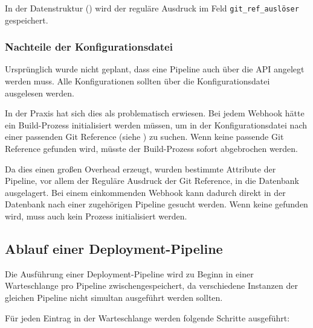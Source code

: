 In der Datenstruktur () wird der reguläre Ausdruck im Feld \texttt{git\_\allowbreak ref\_\allowbreak auslöser} gespeichert.

\subsubsection{Nachteile der Konfigurationsdatei}

Ursprünglich wurde nicht geplant, dass eine Pipeline auch über die API angelegt werden muss. Alle Konfigurationen sollten über die Konfigurationsdatei ausgelesen werden.

In der Praxis hat sich dies als problematisch erwiesen. Bei jedem Webhook hätte ein Build-Prozess initialisiert werden müssen, um in der Konfigurationsdatei nach einer passenden Git Reference (siehe ) zu suchen. Wenn keine passende Git Reference gefunden wird, müsste der Build-Prozess sofort abgebrochen werden.

Da dies einen großen Overhead erzeugt, wurden bestimmte Attribute der Pipeline, vor allem der Reguläre Ausdruck der Git Reference, in die Datenbank ausgelagert. Bei einem einkommenden Webhook kann dadurch direkt in der Datenbank nach einer zugehörigen Pipeline gesucht werden. Wenn keine gefunden wird, muss auch kein Prozess initialisiert werden.

\subsection{Ablauf einer Deployment-Pipeline}
\label{subsec:ablauf-build}

Die Ausführung einer Deployment-Pipeline wird zu Beginn in einer Warteschlange pro Pipeline zwischengespeichert, da verschiedene Instanzen der gleichen Pipeline nicht simultan ausgeführt werden sollten.

Für jeden Eintrag in der Warteschlange werden folgende Schritte ausgeführt:

